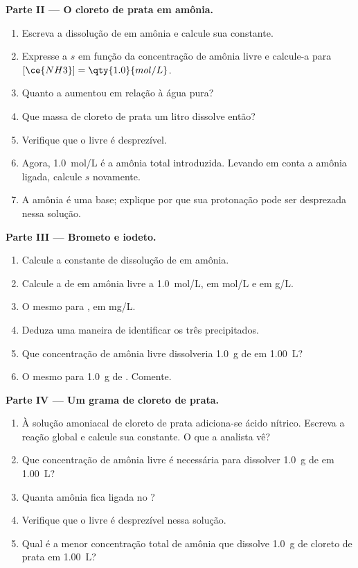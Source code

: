\begin{problem}
\medskip
\noindent\textbf{Parte II --- O cloreto de prata em amônia.}
\begin{enumerate}[resume]
  \item Escreva a dissolução de  em amônia e calcule sua
        constante.
  \item Expresse a  $s$ em função da concentração de amônia
        livre e calcule-a para $[\ce{NH3}] = \qty{1.0}{mol/L}$.
  \item Quanto a  aumentou em relação à água pura?
  \item Que massa de cloreto de prata um litro dissolve então?
  \item Verifique que o  livre é desprezível.
  \item Agora, \qty{1.0}{mol/L} é a amônia total introduzida. Levando em
        conta a amônia ligada, calcule $s$ novamente.
  \item A amônia é uma base; explique por que sua protonação pode ser
        desprezada nessa solução.
\end{enumerate}

\medskip
\noindent\textbf{Parte III --- Brometo e iodeto.}
\begin{enumerate}[resume]
  \item Calcule a constante de dissolução de  em amônia.
  \item Calcule a  de  em amônia livre a
        \qty{1.0}{mol/L}, em \unit{mol/L} e em \unit{g/L}.
  \item O mesmo para , em \unit{mg/L}.
  \item Deduza uma maneira de identificar os três precipitados.
  \item Que concentração de amônia livre dissolveria \qty{1.0}{g} de
         em \qty{1.00}{L}?
  \item O mesmo para \qty{1.0}{g} de . Comente.
\end{enumerate}

\medskip
\noindent\textbf{Parte IV --- Um grama de cloreto de prata.}
\begin{enumerate}[resume]
  \item À solução amoniacal de cloreto de prata adiciona-se ácido
        nítrico. Escreva a reação global e calcule sua constante. O que
        a analista vê?
  \item Que concentração de amônia livre é necessária para dissolver
        \qty{1.0}{g} de  em \qty{1.00}{L}?
  \item Quanta amônia fica ligada no ?
  \item Verifique que o  livre é desprezível nessa solução.
  \item Qual é a menor concentração total de amônia que dissolve
        \qty{1.0}{g} de cloreto de prata em \qty{1.00}{L}?
\end{enumerate}
\end{problem}
